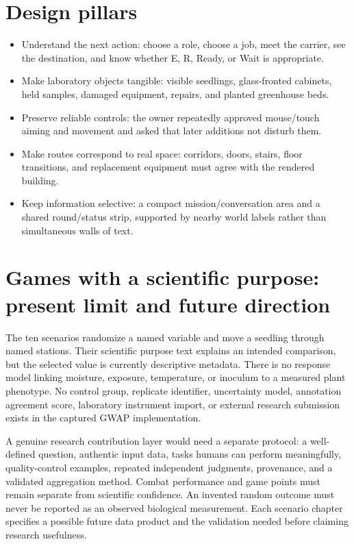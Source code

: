 \section{Design pillars}
\begin{itemize}
\item Understand the next action: choose a role, choose a job, meet the carrier, see the destination, and know whether E, R, Ready, or Wait is appropriate.\allowbreak{}
\item Make laboratory objects tangible: visible seedlings, glass-fronted cabinets, held samples, damaged equipment, repairs, and planted greenhouse beds.\allowbreak{}
\item Preserve reliable controls: the owner repeatedly approved mouse/\allowbreak{}touch aiming and movement and asked that later additions not disturb them.\allowbreak{}
\item Make routes correspond to real space: corridors, doors, stairs, floor transitions, and replacement equipment must agree with the rendered building.\allowbreak{}
\item Keep information selective: a compact mission/\allowbreak{}conversation area and a shared round/\allowbreak{}status strip, supported by nearby world labels rather than simultaneous walls of text.\allowbreak{}
\end{itemize}

\section{Games with a scientific purpose: present limit and future direction}
The ten scenarios randomize a named variable and move a seedling through named stations.\allowbreak{} Their scientific purpose text explains an intended comparison, but the selected value is currently descriptive metadata.\allowbreak{} There is no response model linking moisture, exposure, temperature, or inoculum to a measured plant phenotype.\allowbreak{} No control group, replicate identifier, uncertainty model, annotation agreement score, laboratory instrument import, or external research submission exists in the captured GWAP implementation.\allowbreak{}

A genuine research contribution layer would need a separate protocol: a well-defined question, authentic input data, tasks humans can perform meaningfully, quality-control examples, repeated independent judgments, provenance, and a validated aggregation method.\allowbreak{} Combat performance and game points must remain separate from scientific confidence.\allowbreak{} An invented random outcome must never be reported as an observed biological measurement.\allowbreak{} Each scenario chapter specifies a possible future data product and the validation needed before claiming research usefulness.\allowbreak{}

